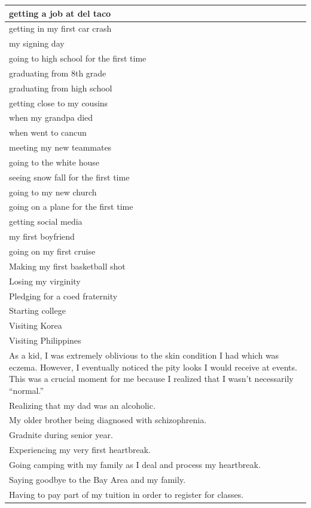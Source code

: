 \documentclass[
  .7em,
  letterpaper,
  DIV=11,
  numbers=noendperiod]{scrartcl}
\begin{document}
\begin{table}
\begin{tabular}{l}
\hline
getting a job at del taco\\
\hline
getting in my first car crash\\
\hline
my signing day\\
\hline
going to high school for the first time\\
\hline
graduating from 8th grade\\
\hline
graduating from high school\\
\hline
getting close to my cousins\\
\hline
when my grandpa died\\
\hline
when went to cancun\\
\hline
meeting my new teammates\\
\hline
going to the white house\\
\hline
seeing snow fall for the first time\\
\hline
going to my new church\\
\hline
going on a plane for the first time\\
\hline
getting social media\\
\hline
my first boyfriend\\
\hline
going on my first cruise\\
\hline
Making my first basketball shot\\
\hline
Losing my virginity\\
\hline
Pledging for a coed fraternity\\
\hline
Starting college\\
\hline
Visiting Korea\\
\hline
Visiting Philippines\\
\hline
As a kid, I was extremely oblivious to the skin condition I had which was eczema. However, I eventually noticed the pity looks I would receive at events. This was a crucial moment for me because I realized that I wasn’t necessarily “normal.”\\
\hline
Realizing that my dad was an alcoholic.\\
\hline
My older brother being diagnosed with schizophrenia.\\
\hline
Gradnite during senior year.\\
\hline
Experiencing my very first heartbreak.\\
\hline
Going camping with my family as I deal and process my heartbreak.\\
\hline
Saying goodbye to the Bay Area and my family.\\
\hline
Having to pay part of my tuition in order to register for classes.\\

\end{tabular}
\end{table}
\end{document}
